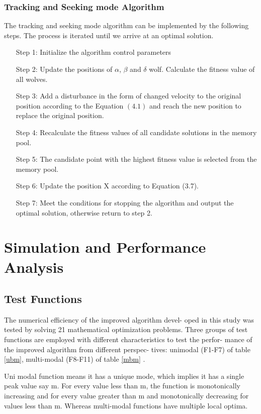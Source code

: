 \documentclass[11pt]{report}
\begin{document}
\subsection{Tracking and Seeking mode Algorithm}
The tracking and seeking mode algorithm can be implemented by the following steps. The process is iterated until we arrive at an optimal solution.
\begin{itemize}
\item[Step 1:]  Initialize the algorithm control parameters
\item[Step 2:]  Update the positions of $\alpha$, $\beta$ and $\delta$ wolf. Calculate the fitness value of all wolves.
\item[Step 3:]  Add a disturbance in the form of changed velocity to the original position according to the Equation $(4.1)$ and reach the new position to replace the original position.
\item[Step 4:] Recalculate the fitness values of all candidate solutions in the memory pool.
\item[Step 5:] The candidate point with the highest fitness value is selected from the memory pool.
\item[Step 6:] Update the position X according to Equation (3.7).
\item[Step 7:]  Meet the conditions for stopping the algorithm and output the optimal solution, otherwise return to step 2.

\end{itemize}

\chapter{Simulation and Performance Analysis}
\section{Test Functions}
The numerical efficiency of the improved algorithm devel-
oped in this study was tested by solving 21 mathematical
optimization problems. Three groups of test functions are
employed with different characteristics to test the perfor-
mance of the improved algorithm from different perspec-
tives: unimodal (F1-F7) of table \ref{ubm}, multi-modal (F8-F11) of table \ref{mbm} \cite{two}.
\par Uni modal function means it has a unique mode, which implies it has a single peak value say m. For every value less than m, the function is monotonically increasing and for every value greater than m and monotonically decreasing for values less than m.
Whereas multi-modal functions have multiple local optima.
\end{document}
